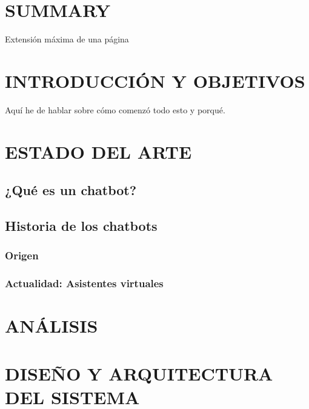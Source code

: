 \documentclass[spanish,12pt, a4paper, twoside]{paper}
\let\oldsection\section
\def\section{\cleardoublepage\oldsection}
\begin{document}
\section*{SUMMARY}
Extensión máxima de una página


\tableofcontents %



\listoffigures
\listoftables



\newpage
{} 

\section{INTRODUCCIÓN Y OBJETIVOS}

\noindent Aquí he de hablar sobre cómo comenzó todo esto y porqué.

\section{ESTADO DEL ARTE}

\subsection{¿Qué es un chatbot?}

\subsection{Historia de los chatbots}

\subsubsection{Origen}

\subsubsection{Actualidad: Asistentes virtuales}

\section{ANÁLISIS}



\section{DISEÑO Y ARQUITECTURA DEL SISTEMA}
\end{document}
